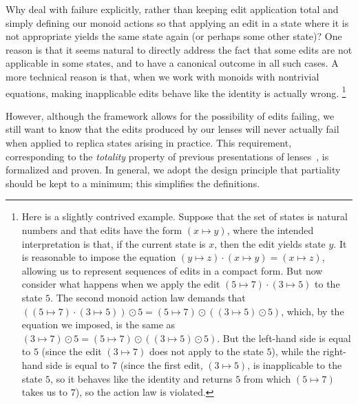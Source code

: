 Why deal with failure explicitly, rather than keeping edit application total
and simply defining our monoid actions so that applying an edit in a state
where it is not appropriate yields the same state again (or perhaps some
other state)?  One reason is that it seems natural to directly address the
fact that some edits are not applicable in some states, and to have a
canonical outcome in all such cases.  A more technical reason is that, when
we work with monoids with nontrivial equations, making inapplicable edits
behave like the identity is actually
wrong.%
%
\footnote{Here is a slightly contrived example.  Suppose that the set of
  states is natural numbers and that edits have the form $(x\mapsto y)$,
  where the intended interpretation is that, if the current state is $x$,
  then the edit yields state $y$.  It is reasonable to impose the equation
  $(y\mapsto z)\cdot(x\mapsto y) = (x\mapsto z)$, allowing us to represent
  sequences of edits in a compact form.  But now consider what happens when
  we apply the edit $(5\mapsto 7)\cdot(3\mapsto 5)$ to the state $5$.  The
  second monoid action law demands that $((5\mapsto 7)\cdot(3\mapsto 5))
  \odot 5 = (5\mapsto 7)\odot((3\mapsto 5) \odot 5)$, which, by the equation
  we imposed, is the same as $(3\mapsto 7) \odot 5 = (5\mapsto
  7)\odot((3\mapsto 5) \odot 5)$.  But the left-hand side is equal to $5$
  (since the edit $(3\mapsto 7)$ does not apply to the state $5$), while the
  right-hand side is equal to $7$ (since the first edit, $(3\mapsto 5)$, is
  inapplicable to the state $5$, so it behaves like the identity and returns
  $5$ from which $(5\mapsto 7)$ takes us to $7$), so the action law is
  violated.}

However, although the framework allows for the possibility of edits failing,
we still want to know that the edits produced by our lenses will never
actually fail when applied to replica states arising in practice.  This
requirement, corresponding to the {\em totality} property of previous
presentations of lenses~\cite{Focal2005}, is formalized and proven.
In general, we adopt the design principle that partiality
should be kept to a minimum; this simplifies the definitions.


\iflater
{}
\fi

